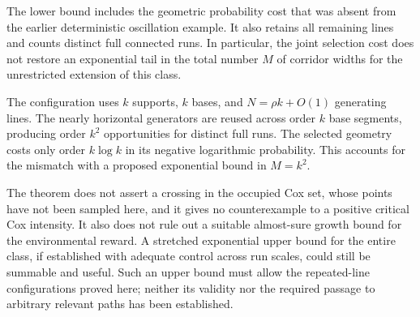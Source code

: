 \documentclass[11pt,letterpaper]{article}
\begin{document}
The lower bound includes the geometric probability cost that was absent from the earlier deterministic oscillation example. It also retains all remaining lines and counts distinct full connected runs. In particular, the joint selection cost does not restore an exponential tail in the total number $M$ of corridor widths for the unrestricted extension of this class.

The configuration uses $k$ supports, $k$ bases, and $N=\rho k+O(1)$ generating lines. The nearly horizontal generators are reused across order $k$ base segments, producing order $k^2$ opportunities for distinct full runs. The selected geometry costs only order $k\log k$ in its negative logarithmic probability. This accounts for the mismatch with a proposed exponential bound in $M=k^2$.

The theorem does not assert a crossing in the occupied Cox set, whose points have not been sampled here, and it gives no counterexample to a positive critical Cox intensity. It also does not rule out a suitable almost-sure growth bound for the environmental reward. A stretched exponential upper bound for the entire class, if established with adequate control across run scales, could still be summable and useful. Such an upper bound must allow the repeated-line configurations proved here; neither its validity nor the required passage to arbitrary relevant paths has been established.



\end{document}
